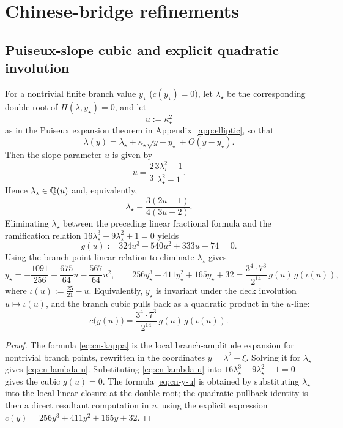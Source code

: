 \section{Chinese-bridge refinements}\label{app:cn-bridge}

\subsection{Puiseux-slope cubic and explicit quadratic involution}
\label{sec:cn-puiseux-u}

\begin{proposition}\label{prop:puiseux-u-bridge}
For a nontrivial finite branch value \(y_\star\) (\(c(y_\star)=0\)), let \(\lambda_\star\) be the corresponding double root of \(\Pi(\lambda,y_\star)=0\), and let
\[
u:=\kappa_\star^2
\]
as in the Puiseux expansion theorem in Appendix~\ref{app:elliptic}, so that
\[
\lambda(y)=\lambda_\star\pm\kappa_\star\sqrt{y-y_\star}+O(y-y_\star).
\]
Then the slope parameter \(u\) is given by
\begin{equation}\label{eq:cn-kappa}
u=\frac{2}{3}\frac{3\lambda_\star^{2}-1}{\lambda_\star^{2}-1}.
\end{equation}
Hence \(\lambda_\star\in\mathbb{Q}(u)\) and, equivalently,
\begin{equation}\label{eq:cn-lambda-u}
\lambda_\star=\frac{3(2u-1)}{4(3u-2)}.
\end{equation}
Eliminating \(\lambda_\star\) between the preceding linear fractional formula and the ramification relation \(16\lambda_\star^3-9\lambda_\star^2+1=0\) yields
\[
g(u):=324u^{3}-540u^{2}+333u-74=0.
\]
Using the branch-point linear relation to eliminate \(\lambda_\star\) gives
\begin{equation}\label{eq:cn-y-u}
y_\star=-\frac{1091}{256}+\frac{675}{64}u-\frac{567}{64}u^2,
\qquad
256y_\star^3+411y_\star^2+165y_\star+32
=\frac{3^4\cdot 7^3}{2^{14}}\,g(u)\,g(\iota(u)),
\end{equation}
where \(\iota(u):=\frac{25}{21}-u\). Equivalently, \(y_\star\) is invariant under the deck involution \(u\mapsto\iota(u)\), and the branch cubic pulls back as a quadratic product in the \(u\)-line:
\[
c\!\bigl(y(u)\bigr)=\frac{3^4\cdot 7^3}{2^{14}}\,g(u)\,g(\iota(u)).
\]
\end{proposition}

\begin{proof}
The formula \eqref{eq:cn-kappa} is the local branch-amplitude expansion for nontrivial branch points, rewritten in the coordinates \(y=\lambda^2+\xi\). Solving it for \(\lambda_\star\) gives \eqref{eq:cn-lambda-u}.
Substituting \eqref{eq:cn-lambda-u} into \(16\lambda_\star^3-9\lambda_\star^2+1=0\) gives the cubic \(g(u)=0\).
The formula \eqref{eq:cn-y-u} is obtained by substituting \(\lambda_\star\) into the local linear closure at the double root; the quadratic pullback identity is then a direct resultant computation in \(u\), using the explicit expression \(c(y)=256y^3+411y^2+165y+32\).
\end{proof}

